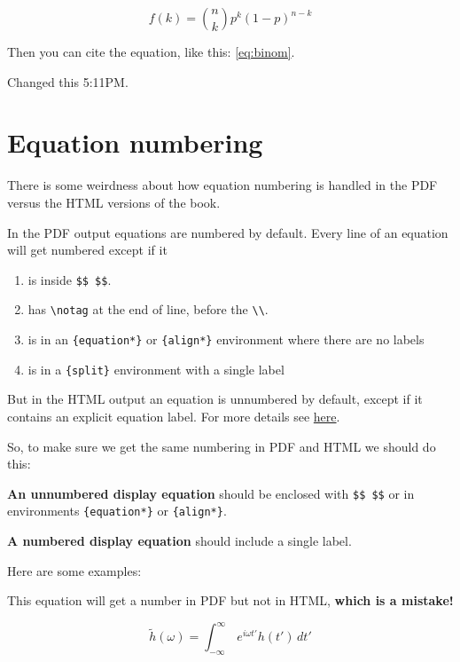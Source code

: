 \documentclass[]{book}
\providecommand{\tightlist}{%
  \setlength{\itemsep}{0pt}\setlength{\parskip}{0pt}}
\begin{document}
\begin{equation}
f\left(k\right)=\binom{n}{k}p^k\left(1-p\right)^{n-k} \label{eq:binom2}
\end{equation}

Then you can cite the equation, like this: \eqref{eq:binom}.

Changed this 5:11PM.

\hypertarget{equation-numbering}{%
\section{Equation numbering}\label{equation-numbering}}

There is some weirdness about how equation numbering is handled in the PDF versus the HTML versions of the book.

In the PDF output equations are numbered by default. Every line of an equation will get numbered except if it

\begin{enumerate}
\def\labelenumi{\arabic{enumi}.}
\tightlist
\item
  is inside \texttt{\$\$\ \$\$}.
\item
  has \texttt{\textbackslash{}notag} at the end of line, before the \texttt{\textbackslash{}\textbackslash{}}.
\item
  is in an \texttt{\{equation*\}} or \texttt{\{align*\}} environment where there are no labels
\item
  is in a \texttt{\{split\}} environment with a single label
\end{enumerate}

But in the HTML output an equation is unnumbered by default, except if it contains an explicit equation label. For more details see \href{https://bookdown.org/yihui/bookdown/markdown-extensions-by-bookdown.html}{here}.

So, to make sure we get the same numbering in PDF and HTML we should do this:

\textbf{An unnumbered display equation} should be enclosed with \texttt{\$\$\ \$\$} or in environments \texttt{\{equation*\}} or \texttt{\{align*\}}.

\textbf{A numbered display equation} should include a single label.

Here are some examples:

This equation will get a number in PDF but not in HTML, \textbf{which is a mistake!}

\begin{equation} 
  \tilde h(\omega) = \int_{-\infty}^{\infty}\,e^{i\omega t'} h(t') \, dt'
\end{equation}
\end{document}
